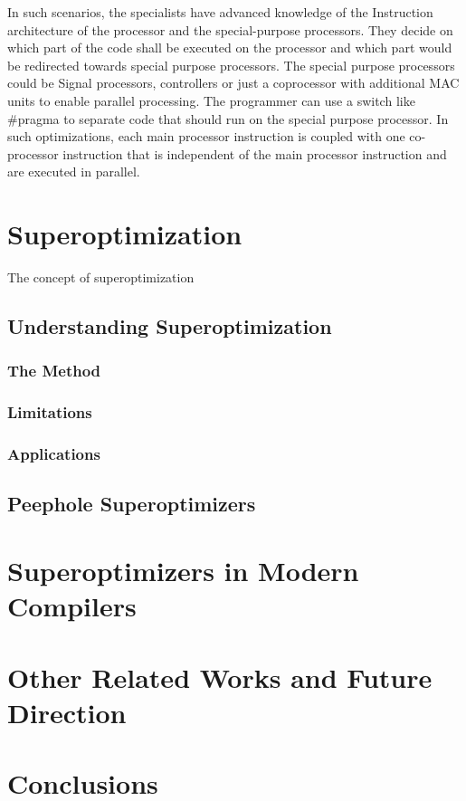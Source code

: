 \documentclass[sigconf]{acmart}
\begin{document}
In such scenarios, the specialists have advanced knowledge of the Instruction architecture of the processor and the special-purpose processors. They decide on which part of the code shall be executed on the processor and which part would be redirected towards special purpose processors. The special purpose processors could be Signal processors, controllers or just a coprocessor with additional MAC units to enable parallel processing. The programmer can use a switch like \#pragma to separate code that should run on the special purpose processor. In such optimizations, each main processor instruction is coupled with one co-processor instruction that is independent of the main processor instruction and are executed in parallel. 


\section{Superoptimization}

The concept of superoptimization 


\subsection{Understanding Superoptimization}

\subsubsection{The Method}

\subsubsection{Limitations}

\subsubsection{Applications}

\subsection{Peephole Superoptimizers}


\section{Superoptimizers in Modern Compilers}

\section{Other Related Works and Future Direction}


\section{Conclusions}



\end{document}

